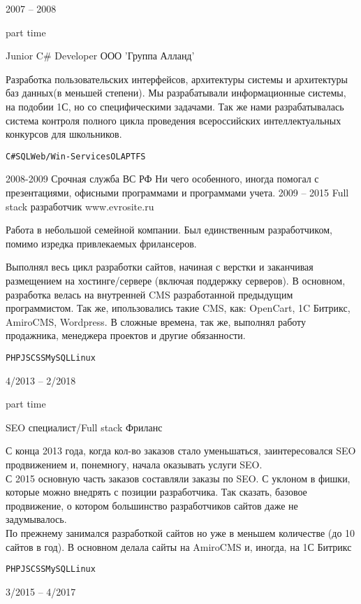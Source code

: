 \documentclass[10pt]{tpl/developercv} %
\begin{document}

\begin{entrylist}
	\entry
		{2007 -- 2008

		\footnotesize{part time}}
		{Junior C\# Developer}
		{ООО 'Группа Алланд'}
		{Разработка пользовательских интерфейсов, архитектуры системы и архитектуры баз данных(в меньшей степени). Мы разрабатывали информационные системы, на подобии 1С, но со специфическими задачами. Так же нами разрабатывалась система контроля полного цикла проведения всероссийских интеллектуальных конкурсов для школьников.

		\texttt{C\#}\slashsep\texttt{SQL}\slashsep\texttt{Web/Win-Services}\slashsep\texttt{OLAP}\slashsep\texttt{TFS}}
	\entry
		{2008-2009}
		{Срочная служба}
		{ВС РФ}
		{Ни чего особенного, иногда помогал с презентациями, офисными программами и программами учета.}
	\entry
		{2009 -- 2015}
		{Full stack разработчик}
		{www.evrosite.ru}
		{Работа в небольшой семейной компании. Был единственным разработчиком, помимо изредка привлекаемых фрилансеров.

		Выполнял весь цикл разработки сайтов, начиная с верстки и заканчивая размещением на хостинге/сервере (включая поддержку серверов). В основном, разработка велась на внутренней CMS разработанной предыдущим программистом. Так же, ипользовались такие CMS, как: OpenCart, 1C Битрикс, AmiroCMS, Wordpress. В сложные времена, так же, выполнял работу продажника, менеджера проектов и другие обязанности.

		\texttt{PHP}\slashsep\texttt{JS}\slashsep\texttt{CSS}\slashsep\texttt{MySQL}\slashsep\texttt{Linux}}

	\entry
		{4/2013 -- 2/2018

		\footnotesize{part time}}
		{SEO специалист/Full stack}
		{Фриланс}
		{С конца 2013 года, когда кол-во заказов стало уменьшаться, заинтересовался SEO продвижением и, понемногу, начала оказывать услуги SEO.\\
		С 2015 основную часть заказов составляли заказы по SEO. С уклоном в фишки, которые можно внедрять с позиции разработчика. Так сказать, базовое продвижение, о котором большинство разработчиков сайтов даже не задумывалось.\\
		По прежнему занимался разработкой сайтов но уже в меньшем количестве (до 10 сайтов в год). В основном делала сайты на AmiroCMS и, иногда, на 1С Битрикс

		\texttt{PHP}\slashsep\texttt{JS}\slashsep\texttt{CSS}\slashsep\texttt{MySQL}\slashsep\texttt{Linux}}
	\entry
		{3/2015 -- 4/2017

}
\end{entrylist}
\end{document}
